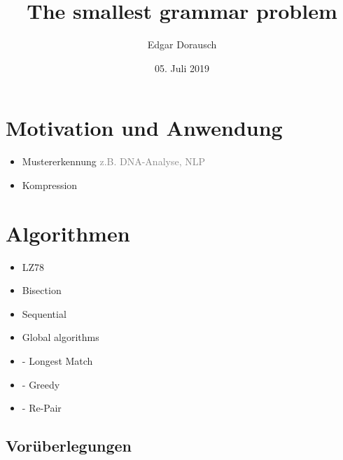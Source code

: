 \documentclass[xcolor=dvipsnames]{beamer}
\title{The smallest grammar problem}
\date{05. Juli 2019}
\author{Edgar Dorausch}
\begin{document}
\maketitle


\newcommand{\SubItem}[1]{
  \setlength\itemindent{15pt} \item[-] #1
}
\newcommand{\Gap}{$ $ \linebreak}
\newcommand{\FrameName}{
	\ifthenelse{\equal{\subsecname}{}}{
		\secname
	}{
		\secname \thinspace -\thinspace\subsecname
	}
}

\newcommand{\Fresh}{\ddagger}
\newcommand{\Hint}[1]{\textcolor{gray}{#1}}

\newcommand{\PDFC}[1]{
	\ifthenelse{\boolean{WithComments}}{
		\pdfcomment[color=red,icon=Note]{#1}
	}{
	}
}

\section{Motivation und Anwendung}

\begin{frame}{\FrameName}
	\begin{itemize}[<+->]
		\item Mustererkennung \linebreak
		\Hint{z.B. DNA-Analyse, NLP}
		\item Kompression
	\end{itemize}
\end{frame}





\section{Algorithmen}

\begin{frame}{\FrameName}
	\begin{itemize}[<+->]
		\item LZ78
		\item Bisection 
		\item Sequential
		\item Global algorithms
		\SubItem{Longest Match}
		\SubItem{Greedy}
		\SubItem{Re-Pair}
	\end{itemize}
\end{frame}

\subsection{Vorüberlegungen}
\end{document}
